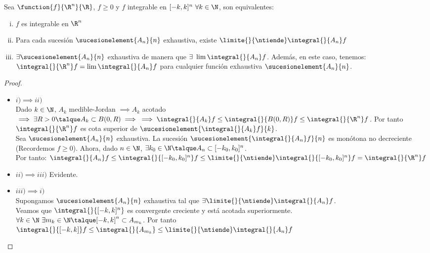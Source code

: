 \begin{proposicion} Sea $\function{f}{\R^n}{\R}$, $f\geq 0$ y $f$ integrable en $[-k,k]^n\ \forall k\in\N$, son equivalentes:
\begin{enumerate}[i)]
\item $f$ es integrable en $\R^n$
\item Para cada sucesión $\sucesionelement{A_n}{n}$ exhaustiva, existe $\limite{}{\ntiende}\integral{}{A_n}f$
\item $\exists \sucesionelement{A_n}{n}$ exhaustiva de manera que $\exists\ \lim\integral{}{A_n}f$. Además, en este caso, tenemos:
$\integral{}{\R^n}f=\lim\integral{}{A_n}f$ para cualquier función exhaustiva  $\sucesionelement{A_n}{n}$.
\end{enumerate}
\begin{proof}\ 
\begin{itemize}
\item $i)\implies ii)$\\
Dado $k\in\N$, $A_k$ medible-Jordan $\implies A_k$ acotado $\implies\exists R>0\talque A_k\subset B(0,R)\implies\\\implies\integral{}{A_k}f\leq\integral{}{B(0,R)}f\leq\integral{}{\R^n}f$. Por tanto $\integral{}{\R^n}f$ es cota superior de $\sucesionelement{\integral{}{A_k}f}{k}$.\\
Sea $\sucesionelement{A_n}{n}$ exhaustiva. La sucesión $\sucesionelement{\integral{}{A_n}f}{n}$ es monótona no decreciente (Recordemos $f\geq 0$). Ahora, dado $n\in\N$, $\exists k_0\in\N\talque A_n\subset[-k_0,k_0]^n$.\\ Por tanto: $\integral{}{A_n}f\leq  \integral{}{[-k_0,k_0]^n}f\leq \limite{}{\ntiende}\integral{}{[-k_0,k_0]^n}f=\integral{}{\R^n}f$
\item $ii)\implies iii)$ Evidente.
\item $iii)\implies i)$\\
Supongamos $\sucesionelement{A_n}{n}$ exhaustiva tal que $\exists\limite{}{\ntiende}\integral{}{A_n}f$.\\
Veamos que $\integral{}{[-k,k]^n}$ es convergente creciente y está acotada superiormente.\\
$\forall k\in\N\ \exists m_k\in\N\talque[-k,k]^n\subset A_{m_k}$. Por tanto $\integral{}{[-k,k]}f\leq \integral{}{A_{m_k}}\leq \limite{}{\ntiende}\integral{}{A_n}f$
\end{itemize}
\end{proof}
\end{proposicion}

